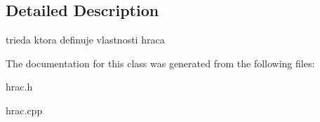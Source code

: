 \subsection{Detailed Description}
trieda ktora definuje vlastnosti hraca 

The documentation for this class was generated from the following files\-:\begin{DoxyCompactItemize}
\item 
hrac.\-h\item 
hrac.\-cpp\end{DoxyCompactItemize}
